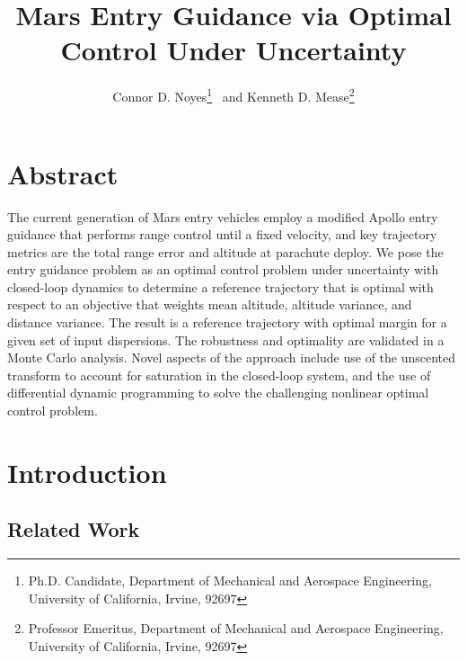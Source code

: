 \documentclass[letterpaper, paper,11pt]{AAS}
\title{Mars Entry Guidance via Optimal Control Under Uncertainty}
\begin{document}
\author{Connor D. Noyes\thanks{Ph.D. Candidate, Department of Mechanical and Aerospace Engineering, University of California, Irvine, 92697} \ and Kenneth D. Mease\thanks{Professor Emeritus, Department of Mechanical and Aerospace Engineering, University of California, Irvine, 92697}}
\maketitle




\section{Abstract}
The current generation of Mars entry vehicles employ a modified Apollo entry guidance that performs range control until a fixed velocity, and key trajectory metrics are the total range error and altitude at parachute deploy. We pose the entry guidance problem as an optimal control problem under uncertainty with closed-loop dynamics to determine a reference trajectory that is optimal with respect to an objective that weights mean altitude, altitude variance, and distance variance. The result is a reference trajectory with optimal margin for a given set of input dispersions. The robustness and optimality are validated in a Monte Carlo analysis. Novel aspects of the approach include use of the unscented transform to account for saturation in the closed-loop system, and the use of differential dynamic programming to solve the challenging nonlinear optimal control problem. 
\section{Introduction}

\subsection{Related Work}
\end{document}
